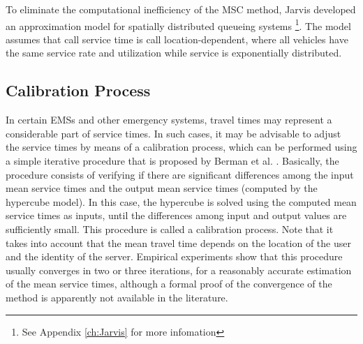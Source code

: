 To eliminate the computational inefficiency of the MSC method,
Jarvis \cite{jarvis1985approximating} developed
an approximation model
for spatially distributed queueing systems
\footnote{See Appendix \ref{ch:Jarvis} for more infomation}.
The model assumes that call service time
is call location-dependent,
where all vehicles
have the same service rate and utilization
while service is exponentially distributed.

\subsection{Calibration Process}
In certain EMSs
and other emergency systems,
travel times may represent
a considerable part of service times.
In such cases,
it may be advisable
to adjust the service times
by means of a calibration process,
which can be performed
using a simple iterative procedure
that is proposed by Berman et al. \cite{berman1987stochastic}.
Basically,
the procedure consists of
verifying
if there are
significant differences among the input mean service times
and the output mean service times (computed by the hypercube model).
In this case,
the hypercube is solved
using the computed mean service times as inputs,
until
the differences
among input and output values
are sufficiently small.
This procedure is called
a calibration process.
Note that
it takes into account
that the mean travel time
depends on the location of the user
and the identity of the server.
Empirical experiments show
that this procedure
usually converges in two or three iterations,
for a reasonably accurate estimation of the mean service times,
although a formal proof of the convergence of the method
is apparently not available in the literature.
